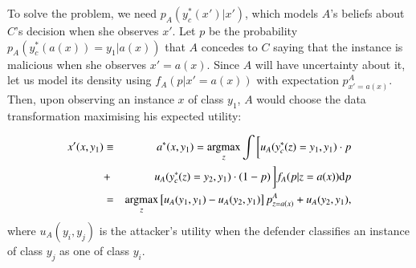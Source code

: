 To solve the problem, we need $p_A(y^*_c(x')|x')$, which models $A$'s beliefs about $C$'s decision when she observes $x'$.  Let
$p$ be the probability $p_A( y_c^* (a (x)) = y_1 | a (x) )$
that $A$ concedes to $C$ saying that the instance is malicious when she observes $x' = a(x)$. 
%
%
Since $A$ will have uncertainty about it, let us model its density using $f_A (p | x' = a(x) )$ with expectation $p_{x' = a(x)}^A $. Then, upon observing an instance $x$ of class $y_1$, $A$ would choose the data transformation maximising his expected utility:

%

\begin{eqnarray}\label{att_prob_n}
x'(x,y_1) &\equiv& a^*(x, y_1) = \operatorname*{argmax}_{z} \int \bigg[ u_A( y_c^*(z) = y_1,y_1) \cdot p \nonumber\\
&+& u_A(y_c^*(z) = y_2, y_1) \cdot (1-p)\, \bigg] f _A (p | z = a(x) ) \text{d}p \nonumber \\
&=& \operatorname*{argmax}_{z}
\left[ u_A(y_1,y_1) - u_A(y_2, y_1) \right] p_{z = a(x)}^A   +  u_A(y_2, y_1),
\end{eqnarray}
%
where $u_A(y_i, y_j)$ is the attacker's utility when the defender classifies an instance of class $y_j$ as one of  class $y_i$. 


